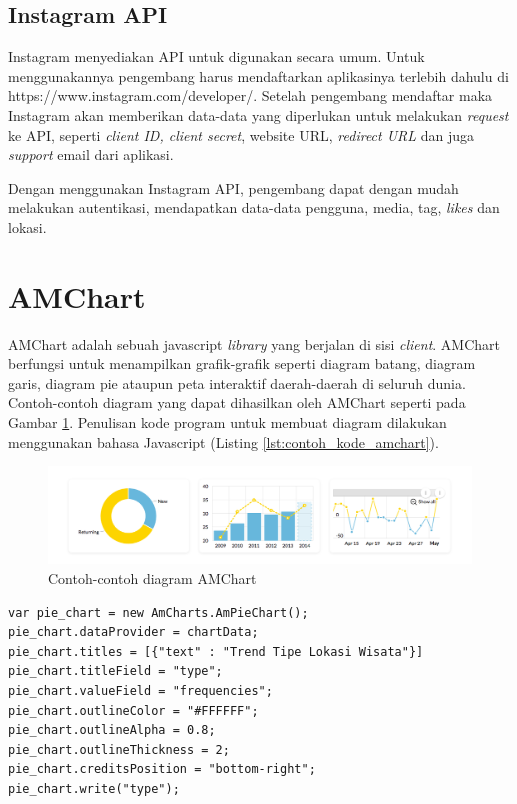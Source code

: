 \subsection{Instagram API}
Instagram menyediakan API untuk digunakan secara umum. Untuk menggunakannya pengembang harus mendaftarkan aplikasinya terlebih dahulu di https://www.instagram.com/developer/. Setelah pengembang mendaftar maka Instagram akan memberikan data-data yang diperlukan untuk melakukan \textit{request} ke API, seperti \textit{client ID, client secret}, website URL, \textit{redirect URL} dan juga \textit{support} email dari aplikasi.

Dengan menggunakan Instagram API, pengembang dapat dengan mudah melakukan autentikasi, mendapatkan data-data pengguna, media, tag, \textit{likes} dan lokasi. \cite{InstagramApi:2016}

\section{AMChart}
AMChart adalah sebuah javascript \textit{library} yang berjalan di sisi \textit{client}. AMChart berfungsi untuk menampilkan grafik-grafik seperti diagram batang, diagram garis, diagram pie ataupun peta interaktif daerah-daerah di seluruh dunia. Contoh-contoh diagram yang dapat dihasilkan oleh AMChart seperti pada Gambar \ref{fig:contoh_amchart}. Penulisan kode program untuk membuat diagram dilakukan menggunakan bahasa Javascript (Listing \ref{lst:contoh_kode_amchart}). 

\begin{figure}
	\centering
	\includegraphics[scale=0.3]{Gambar/contoh-amchart.png}
	\caption[Contoh-contoh diagram AMChart]{Contoh-contoh diagram AMChart\cite{AmCharts:2016}} 
	\label{fig:contoh_amchart}
\end{figure}

\begin{lstlisting}[basicstyle=\tiny,caption=Contoh Kode Diagram Pie di AMChart,label={lst:contoh_kode_amchart}]
var pie_chart = new AmCharts.AmPieChart();
pie_chart.dataProvider = chartData;
pie_chart.titles = [{"text" : "Trend Tipe Lokasi Wisata"}]
pie_chart.titleField = "type";
pie_chart.valueField = "frequencies";
pie_chart.outlineColor = "#FFFFFF";
pie_chart.outlineAlpha = 0.8;
pie_chart.outlineThickness = 2;
pie_chart.creditsPosition = "bottom-right";
pie_chart.write("type");
\end{lstlisting}

